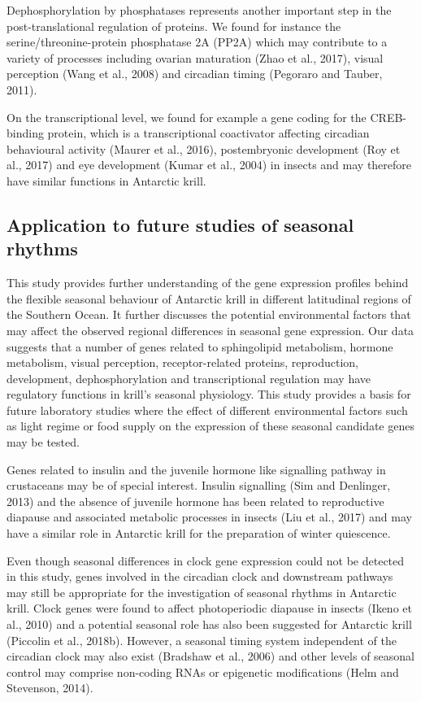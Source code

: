 Dephosphorylation by phosphatases represents another important step in the
post-translational regulation of proteins. We found for instance the
serine/threonine-protein phosphatase 2A (PP2A) which may contribute to a
variety of processes including ovarian maturation (Zhao et al., 2017), visual
perception (Wang et al., 2008) and circadian timing (Pegoraro and Tauber,
2011).

On the transcriptional level, we found for example a gene coding for the
CREB-binding protein, which is a transcriptional coactivator affecting
circadian behavioural activity (Maurer et al., 2016), postembryonic development
(Roy et al., 2017) and eye development (Kumar et al., 2004) in insects and may
therefore have similar functions in Antarctic krill.

\subsection*{Application to future studies of seasonal rhythms}

This study provides further understanding of the gene expression profiles
behind the flexible seasonal behaviour of Antarctic krill in different
latitudinal regions of the Southern Ocean. It further discusses the potential
environmental factors that may affect the observed regional differences in
seasonal gene expression. Our data suggests that a number of genes related to
sphingolipid metabolism, hormone metabolism, visual perception,
receptor-related proteins, reproduction, development, dephosphorylation and
transcriptional regulation may have regulatory functions in krill's seasonal
physiology. This study provides a basis for future laboratory studies where the
effect of different environmental factors such as light regime or food supply
on the expression of these seasonal candidate genes may be tested. 

Genes related to insulin and the juvenile hormone like signalling pathway in
crustaceans may be of special interest. Insulin signalling (Sim and Denlinger,
2013) and the absence of juvenile hormone has been related to reproductive
diapause and associated metabolic processes in insects (Liu et al., 2017) and
may have a similar role in Antarctic krill for the preparation of winter
quiescence.

Even though seasonal differences in clock gene expression could not be detected
in this study, genes involved in the circadian clock and downstream pathways
may still be appropriate for the investigation of seasonal rhythms in Antarctic
krill. Clock genes were found to affect photoperiodic diapause in insects
(Ikeno et al., 2010) and a potential seasonal role has also been suggested for
Antarctic krill (Piccolin et al., 2018b). However, a seasonal timing system
independent of the circadian clock may also exist (Bradshaw et al., 2006) and
other levels of seasonal control may comprise non-coding RNAs or epigenetic
modifications (Helm and Stevenson, 2014).

